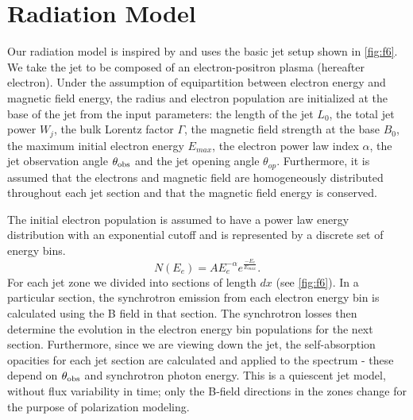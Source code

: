 \section{Radiation Model}

Our radiation model is inspired by \citet{potter_black_2013} and uses the basic jet setup shown in \cref{fig:f6}. We take the jet to be composed of an electron-positron plasma (hereafter electron). Under the assumption of equipartition between electron energy and magnetic field energy, the radius and electron population are initialized at the base of the jet from the input parameters: the length of the jet $L_0$, the total jet power $W_j$, the bulk Lorentz factor $\Gamma$, the magnetic field strength at the base $B_0$, the maximum initial electron energy $E_{max}$, the electron power law index $\alpha$, the jet observation angle $\theta_{\rm obs}$ and the jet opening angle $\theta_{op}$. Furthermore, it is assumed that the electrons and magnetic field are homogeneously distributed throughout each jet section and that the magnetic field energy is conserved.

The initial electron population is assumed to have a power law energy distribution with an exponential cutoff \citep{bregman_diffusive_1985} and is represented by a discrete set of energy bins.
\begin{equation}
N(E_e) = AE_e^{-\alpha}e^{\frac{-E_e}{E_{max}}}.
\end{equation}
For each jet zone we divided into sections of length $dx$ (see \cref{fig:f6}). In a particular section, the synchrotron emission from each electron energy bin is calculated using the B field in that section. The synchrotron losses then determine the evolution in the electron energy bin populations for the next section. Furthermore, since we are viewing down the jet, the self-absorption opacities for each jet section are calculated and applied to the spectrum - these depend on $\theta_{\rm obs}$ and synchrotron photon energy. This is a quiescent jet model, without flux variability in time; only the B-field directions in the zones change for the purpose of polarization modeling.

